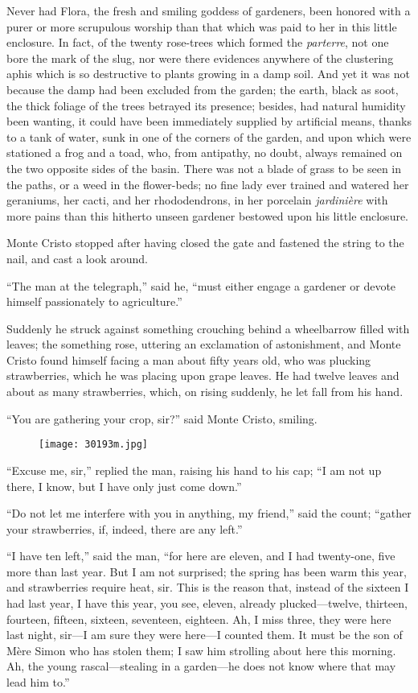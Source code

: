 Never had Flora, the fresh and smiling goddess of gardeners, been
honored with a purer or more scrupulous worship than that which was
paid to her in this little enclosure. In fact, of the twenty rose-trees
which formed the \textit{parterre}, not one bore the mark of the slug, nor
were there evidences anywhere of the clustering aphis which is so
destructive to plants growing in a damp soil. And yet it was not
because the damp had been excluded from the garden; the earth, black as
soot, the thick foliage of the trees betrayed its presence; besides,
had natural humidity been wanting, it could have been immediately
supplied by artificial means, thanks to a tank of water, sunk in one of
the corners of the garden, and upon which were stationed a frog and a
toad, who, from antipathy, no doubt, always remained on the two
opposite sides of the basin. There was not a blade of grass to be seen
in the paths, or a weed in the flower-beds; no fine lady ever trained
and watered her geraniums, her cacti, and her rhododendrons, in her
porcelain \textit{jardinière} with more pains than this hitherto unseen
gardener bestowed upon his little enclosure.

Monte Cristo stopped after having closed the gate and fastened the
string to the nail, and cast a look around.

“The man at the telegraph,” said he, “must either engage a gardener or
devote himself passionately to agriculture.”

Suddenly he struck against something crouching behind a wheelbarrow
filled with leaves; the something rose, uttering an exclamation of
astonishment, and Monte Cristo found himself facing a man about fifty
years old, who was plucking strawberries, which he was placing upon
grape leaves. He had twelve leaves and about as many strawberries,
which, on rising suddenly, he let fall from his hand.

“You are gathering your crop, sir?” said Monte Cristo, smiling.

\begin{figure}[ht]
\texttt{[image: 30193m.jpg]}
\end{figure}

“Excuse me, sir,” replied the man, raising his hand to his cap; “I am
not up there, I know, but I have only just come down.”

“Do not let me interfere with you in anything, my friend,” said the
count; “gather your strawberries, if, indeed, there are any left.”

“I have ten left,” said the man, “for here are eleven, and I had
twenty-one, five more than last year. But I am not surprised; the
spring has been warm this year, and strawberries require heat, sir.
This is the reason that, instead of the sixteen I had last year, I have
this year, you see, eleven, already plucked—twelve, thirteen, fourteen,
fifteen, sixteen, seventeen, eighteen. Ah, I miss three, they were here
last night, sir—I am sure they were here—I counted them. It must be the
son of Mère Simon who has stolen them; I saw him strolling about here
this morning. Ah, the young rascal—stealing in a garden—he does not
know where that may lead him to.”

